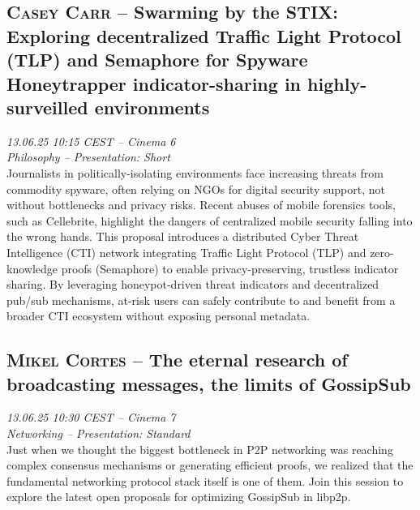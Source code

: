 \subsection {\textsc{Casey Carr}  -- Swarming by the STIX: Exploring decentralized Traffic Light Protocol (TLP) and Semaphore for Spyware Honeytrapper indicator-sharing in highly-surveilled environments} \noindent \textit {13.06.25 10:15 CEST -- Cinema 6\\ Philosophy -- Presentation: Short}\\[1em] Journalists in politically-isolating environments face increasing threats from commodity spyware, often relying on NGOs for digital security support, not without bottlenecks and privacy risks. Recent abuses of mobile forensics tools, such as Cellebrite, highlight the dangers of centralized mobile security falling into the wrong hands. This proposal introduces a distributed Cyber Threat Intelligence (CTI) network integrating Traffic Light Protocol (TLP) and zero-knowledge proofs (Semaphore) to enable privacy-preserving, trustless indicator sharing. By leveraging honeypot-driven threat indicators and decentralized pub/sub mechanisms, at-risk users can safely contribute to and benefit from a broader CTI ecosystem without exposing personal metadata.

\clearpage
\subsection {\textsc{Mikel Cortes}  -- The eternal research of broadcasting messages, the limits of GossipSub} \noindent \textit {13.06.25 10:30 CEST -- Cinema 7\\ Networking -- Presentation: Standard}\\[1em] Just when we thought the biggest bottleneck in P2P networking was reaching complex consensus mechanisms or generating efficient proofs, we realized that the fundamental networking protocol stack itself is one of them. Join this session to explore the latest open proposals for optimizing GossipSub in libp2p.

\clearpage
